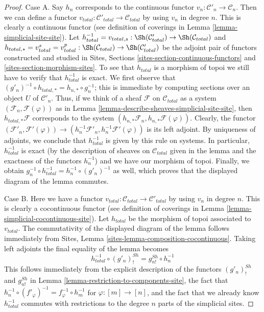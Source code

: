 \begin{proof}
Case A. Say $h_n$ corresponds to the continuous functor
$v_n : \mathcal{C}'_n \to \mathcal{C}_n$. Then we can define
a functor $v_{total} : \mathcal{C}'_{total} \to \mathcal{C}_{total}$
by using $v_n$ in degree $n$. This is clearly a continuous functor
(see definition of coverings in Lemma \ref{lemma-simplicial-site-site}).
Let
$h_{total}^{-1} = v_{total, s} :
\Sh(\mathcal{C}'_{total}) \to \Sh(\mathcal{C}_{total})$ and
$h_{total, *} = v_{total}^s = v_{total}^p :
\Sh(\mathcal{C}_{total}) \to \Sh(\mathcal{C}'_{total})$
be the adjoint pair of functors constructed and studied in
Sites, Sections \ref{sites-section-continuous-functors} and
\ref{sites-section-morphism-sites}.
To see that $h_{total}$ is a morphism of topoi
we still have to verify that $h_{total}^{-1}$ is exact.
We first observe that
$(g'_n)^{-1} \circ h_{total, *} = h_{n, *} \circ g_n^{-1}$;
this is immediate by computing sections over an object $U$
of $\mathcal{C}'_n$. Thus, if we think of a sheaf $\mathcal{F}$
on $\mathcal{C}_{total}$ as a system $(\mathcal{F}_n, \mathcal{F}(\varphi))$
as in Lemma \ref{lemma-describe-sheaves-simplicial-site-site}, then
$h_{total, *}\mathcal{F}$ corresponds to
the system $(h_{n, *}\mathcal{F}_n, h_{n, *}\mathcal{F}(\varphi))$.
Clearly, the functor
$(\mathcal{F}'_n, \mathcal{F}'(\varphi)) \to
(h_n^{-1}\mathcal{F}'_n, h_n^{-1}\mathcal{F}'(\varphi))$
is its left adjoint. By uniqueness of adjoints, we conclude that
$h_{total}^{-1}$ is given by this rule on systems. In particular,
$h_{total}^{-1}$ is exact (by the description of sheaves on
$\mathcal{C}_{total}$ given in the lemma and the exactness of
the functors $h_n^{-1}$) and we have our morphism of topoi.
Finally, we obtain $g_n^{-1} \circ h_{total}^{-1} =
h_n^{-1} \circ (g'_n)^{-1}$ as well, which proves that the
displayed diagram of the lemma commutes.

\medskip\noindent
Case B. Here we have a functor
$v_{total} : \mathcal{C}_{total} \to \mathcal{C}'_{total}$
by using $v_n$ in degree $n$. This is clearly a cocontinuous functor
(see definition of coverings in Lemma \ref{lemma-simplicial-cocontinuous-site}).
Let $h_{total}$ be the morphism of topoi associated to $v_{total}$.
The commutativity of the displayed diagram of the lemma follows
immediately from Sites, Lemma \ref{sites-lemma-composition-cocontinuous}.
Taking left adjoints the final equality of the lemma becomes
$$
h_{total}^{-1} \circ (g'_n)^{Sh}_! = g^{Sh}_{n!} \circ h_n^{-1}
$$
This follows immediately from the explicit description of the functors
$(g'_n)^{Sh}_!$ and $g^{Sh}_{n!}$ in
Lemma \ref{lemma-restriction-to-components-site},
the fact that $h_n^{-1} \circ (f'_\varphi)^{-1} =
f_\varphi^{-1} \circ h_m^{-1}$ for $\varphi : [m] \to [n]$, and
the fact that we already know $h_{total}^{-1}$ commutes
with restrictions to the degree $n$ parts of the simplicial sites.
\end{proof}

